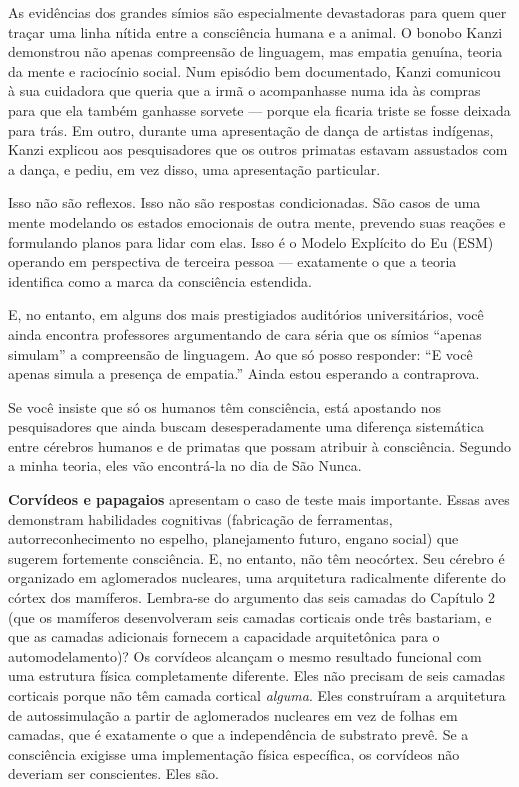 \documentclass[11pt, twoside, openright]{book}
\begin{document}
As evidências dos grandes símios são especialmente devastadoras para quem quer traçar uma linha nítida entre a consciência humana e a animal. O bonobo Kanzi demonstrou não apenas compreensão de linguagem, mas empatia genuína, teoria da mente e raciocínio social. Num episódio bem documentado, Kanzi comunicou à sua cuidadora que queria que a irmã o acompanhasse numa ida às compras para que ela também ganhasse sorvete --- porque ela ficaria triste se fosse deixada para trás. Em outro, durante uma apresentação de dança de artistas indígenas, Kanzi explicou aos pesquisadores que os outros primatas estavam assustados com a dança, e pediu, em vez disso, uma apresentação particular.

Isso não são reflexos. Isso não são respostas condicionadas. São casos de uma mente modelando os estados emocionais de outra mente, prevendo suas reações e formulando planos para lidar com elas. Isso é o Modelo Explícito do Eu (ESM) operando em perspectiva de terceira pessoa --- exatamente o que a teoria identifica como a marca da consciência estendida.

E, no entanto, em alguns dos mais prestigiados auditórios universitários, você ainda encontra professores argumentando de cara séria que os símios ``apenas simulam'' a compreensão de linguagem. Ao que só posso responder: ``E você apenas simula a presença de empatia.'' Ainda estou esperando a contraprova.

Se você insiste que só os humanos têm consciência, está apostando nos pesquisadores que ainda buscam desesperadamente uma diferença sistemática entre cérebros humanos e de primatas que possam atribuir à consciência. Segundo a minha teoria, eles vão encontrá-la no dia de São Nunca.

\textbf{Corvídeos e papagaios} apresentam o caso de teste mais importante. Essas aves demonstram habilidades cognitivas (fabricação de ferramentas, autorreconhecimento no espelho, planejamento futuro, engano social) que sugerem fortemente consciência. E, no entanto, não têm neocórtex. Seu cérebro é organizado em aglomerados nucleares, uma arquitetura radicalmente diferente do córtex dos mamíferos. Lembra-se do argumento das seis camadas do Capítulo 2 (que os mamíferos desenvolveram seis camadas corticais onde três bastariam, e que as camadas adicionais fornecem a capacidade arquitetônica para o automodelamento)? Os corvídeos alcançam o mesmo resultado funcional com uma estrutura física completamente diferente. Eles não precisam de seis camadas corticais porque não têm camada cortical \textit{alguma}. Eles construíram a arquitetura de autossimulação a partir de aglomerados nucleares em vez de folhas em camadas, que é exatamente o que a independência de substrato prevê. Se a consciência exigisse uma implementação física específica, os corvídeos não deveriam ser conscientes. Eles são.
\end{document}
